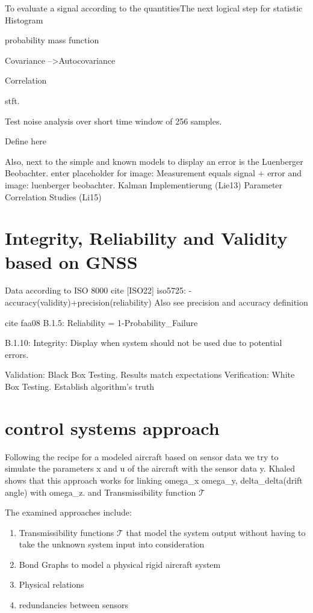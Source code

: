 To evaluate a signal according to the quantitiesThe next logical step for statistic Histogram

probability mass function



Covariance
-->Autocovariance

Correlation


stft.

Test noise analysis over short time window of 256 samples.

Define here





Also, next to the simple and known models to display an error is the Luenberger Beobachter.
enter placeholder for image: Measurement equals signal + error
and image: luenberger beobachter. Kalman Implementierung (Lie13)
Parameter Correlation Studies (Li15)

\section{Integrity, Reliability and Validity based on GNSS}
Data according to ISO 8000 cite [ISO22]
iso5725:
-accuracy(validity)+precision(reliability)
Also see precision and accuracy definition \cite[S.33ff.]{Smith.2006}


cite faa08
B.1.5: Reliability = 1-Probability_Failure

B.1.10: Integrity: Display when system should not be used due to potential errors.

Validation: Black Box Testing. Results match expectations
Verification: White Box Testing. Establish algorithm's truth




\section{control systems approach}

Following the recipe for a modeled aircraft based on sensor data we try to simulate the parameters x and u of the aircraft with the sensor data y. Khaled shows that this approach works for linking omega_x omega_y, delta_delta(drift angle) with omega_z. and Transmissibility function  $\mathcal{T}$


The examined approaches include:
\begin{enumerate}
    \item Transmissibility functions $\mathcal{T}$ that model the system output without having to take the unknown
    system input into consideration
    \item Bond Graphs to model a physical rigid aircraft system
    \item Physical relations
    \item redundancies between sensors
\end{enumerate}

